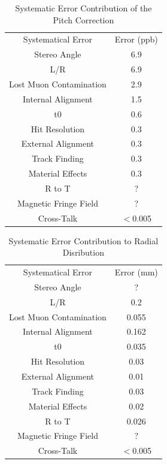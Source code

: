 \documentclass[./Thesis]{subfiles}
\begin{document}
		

\begin{table}%
\begin{center}
\caption{Systematic Error Contribution of the Pitch Correction}
\label{Tab:PitchErrors}
\begin{tabular}{ c c }
\hline
Systematical Error		&   Error (ppb)\\
Stereo Angle			&    6.9 \\
L/R					&    6.9 \\
Lost Muon Contamination &	2.9 \\
Internal Alignment		& 	1.5 \\
t$0$					&	0.6\\
Hit Resolution			&	0.3\\
External Alignment		&	0.3 \\
Track Finding			&	0.3 \\
Material Effects			&	0.3 \\
R to T				& 	? \\
Magnetic Fringe Field	&	? \\
Cross-Talk			&	$<$0.005 \\
\hline
\end{tabular}
\end{center}
\end{table}

\begin{table}%
\begin{center}
\caption{Systematic Error Contribution to Radial Disribution}
\label{Tab:RadialErrors}
\begin{tabular}{ c c }
\hline
Systematical Error		&   Error (mm)\\
Stereo Angle			&    ? \\
L/R					&    0.2\\
Lost Muon Contamination &	0.055 \\
Internal Alignment		&	0.162\\
t$0$					&	0.035 \\
Hit Resolution			&	0.03\\
External Alignment		&	0.01\\
Track Finding			&	0.03 \\
Material Effects			&	0.02\\
R to T				& 	0.026 \\
Magnetic Fringe Field	&	? \\
Cross-Talk			&	$<$0.005 \\
\hline
\end{tabular}
\end{center}
\end{table}

		
		
	
\end{document}
